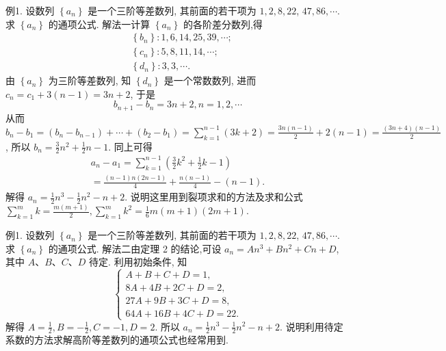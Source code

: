 例1. 设数列 $\left\{a_n\right\}$ 是一个三阶等差数列, 其前面的若干项为 $1,2,8,22$, $47,86, \cdots$. 求 $\left\{a_n\right\}$ 的通项公式.
解法一计算 $\left\{a_n\right\}$ 的各阶差分数列,得
$$
\begin{aligned}
& \left\{b_n\right\}: 1,6,14,25,39, \cdots ; \\
& \left\{c_n\right\}: 5,8,11,14, \cdots ; \\
& \left\{d_n\right\}: 3,3, \cdots .
\end{aligned}
$$
由 $\left\{a_n\right\}$ 为三阶等差数列, 知 $\left\{d_n\right\}$ 是一个常数数列, 进而 $c_n=c_1+3(n-1)= 3 n+2$, 于是
$$
b_{n+1}-b_n=3 n+2, n=1,2, \cdots
$$
从而 $b_n-b_1=\left(b_n-b_{n-1}\right)+\cdots+\left(b_2-b_1\right)=\sum_{k=1}^{n-1}(3 k+2)=\frac{3 n(n-1)}{2}+ 2(n-1)=\frac{(3 n+4)(n-1)}{2}$, 所以 $b_n=\frac{3}{2} n^2+\frac{1}{2} n-1$.
同上可得
$$
\begin{gathered}
a_n-a_1=\sum_{k=1}^{n-1}\left(\frac{3}{2} k^2+\frac{1}{2} k-1\right) \\
=\frac{(n-1) n(2 n-1)}{4}+\frac{n(n-1)}{4}-(n-1) .
\end{gathered}
$$
解得 $a_n=\frac{1}{2} n^3-\frac{1}{2} n^2-n+2$.
说明这里用到裂项求和的方法及求和公式 $\sum_{k=1}^m k=\frac{m(m+1)}{2}, \sum_{k=1}^m k^2= \frac{1}{6} m(m+1)(2 m+1)$.



例1. 设数列 $\left\{a_n\right\}$ 是一个三阶等差数列, 其前面的若干项为 $1,2,8,22$, $47,86, \cdots$. 求 $\left\{a_n\right\}$ 的通项公式.
解法二由定理 2 的结论,可设 $a_n=A n^3+B n^2+C n+D$, 其中 $A 、 B 、 C 、 D$ 待定.
利用初始条件, 知
$$
\left\{\begin{array}{l}
A+B+C+D=1, \\
8 A+4 B+2 C+D=2, \\
27 A+9 B+3 C+D=8, \\
64 A+16 B+4 C+D=22 .
\end{array}\right.
$$
解得 $A=\frac{1}{2}, B=-\frac{1}{2}, C=-1, D=2$.
所以 $a_n=\frac{1}{2} n^3-\frac{1}{2} n^2-n+2$.
说明利用待定系数的方法求解高阶等差数列的通项公式也经常用到.



